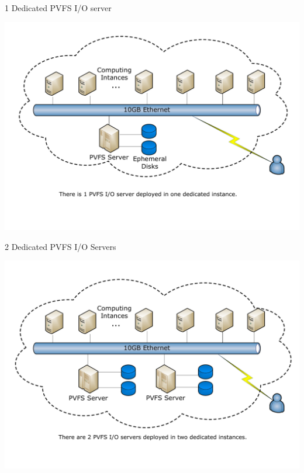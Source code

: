 \documentclass{beamer}
\begin{document}
\begin{frame}{1 Dedicated PVFS I/O server}
    \begin{center}
        \includegraphics[width=\textwidth]{figures/visio/pvfs-1.pdf}
    \end{center}
\end{frame}

\begin{frame}{2 Dedicated PVFS I/O Servers}
    \begin{center}
        \includegraphics[width=\textwidth]{figures/visio/pvfs-2.pdf}
    \end{center}
\end{frame}
\end{document}

